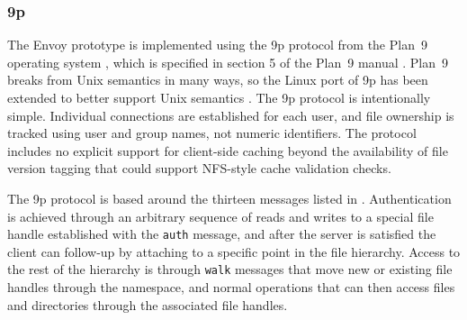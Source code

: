 \subsubsection{9p}

The Envoy prototype is implemented using the 9p protocol from the Plan~9 operating system \cite{pike90,pike92}, which is specified in section 5 of the Plan~9 manual \cite{9man}. Plan~9 breaks from Unix semantics in many ways, so the Linux port of 9p has been extended to better support Unix semantics \cite{hensbergen}. The 9p protocol is intentionally simple. Individual connections are established for each user, and file ownership is tracked using user and group names, not numeric identifiers. The protocol includes no explicit support for client-side caching beyond the availability of file version tagging that could support NFS-style cache validation checks.

The 9p protocol is based around the thirteen messages listed in . Authentication is achieved through an arbitrary sequence of reads and writes to a special file handle established with the \texttt{auth} message, and after the server is satisfied the client can follow-up by attaching to a specific point in the file hierarchy. Access to the rest of the hierarchy is through \texttt{walk} messages that move new or existing file handles through the namespace, and normal operations that can then access files and directories through the associated file handles.

